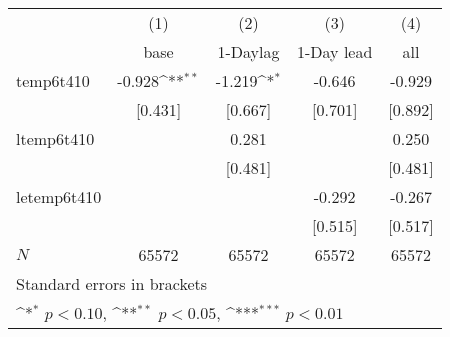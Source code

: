 {
\def\sym#1{\ifmmode^{#1}\else\(^{#1}\)\fi}
\begin{tabular}{l*{4}{c}}
\hline\hline
            &\multicolumn{1}{c}{(1)}&\multicolumn{1}{c}{(2)}&\multicolumn{1}{c}{(3)}&\multicolumn{1}{c}{(4)}\\
            &\multicolumn{1}{c}{base}&\multicolumn{1}{c}{1-Daylag}&\multicolumn{1}{c}{1-Day lead}&\multicolumn{1}{c}{all}\\
\hline
temp6t410   &      -0.928\sym{**} &      -1.219\sym{*}  &      -0.646         &      -0.929         \\
            &     [0.431]         &     [0.667]         &     [0.701]         &     [0.892]         \\
[1em]
ltemp6t410  &                     &       0.281         &                     &       0.250         \\
            &                     &     [0.481]         &                     &     [0.481]         \\
[1em]
letemp6t410 &                     &                     &      -0.292         &      -0.267         \\
            &                     &                     &     [0.515]         &     [0.517]         \\
\hline
\(N\)       &       65572         &       65572         &       65572         &       65572         \\
\hline\hline
\multicolumn{5}{l}{\footnotesize Standard errors in brackets}\\
\multicolumn{5}{l}{\footnotesize \sym{*} \(p<0.10\), \sym{**} \(p<0.05\), \sym{***} \(p<0.01\)}\\
\end{tabular}
}
